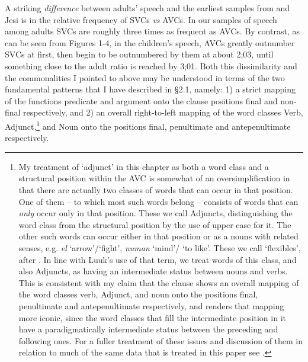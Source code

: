 \documentclass[output=paper]{langsci/langscibook}
\begin{document}
  A striking \textit{difference} between adults’ speech and the earliest samples from  and Jesi is in the relative frequency of SVCs \textit{vs} AVCs. In our samples of speech among adults SVCs are roughly three times as frequent as AVCs. By contrast, as can be seen from Figures 1-4, in the children's speech, AVCs greatly outnumber SVCs at first, then begin to be outnumbered by them at about 2;03, until something close to the adult ratio is reached by 3;01. Both this dissimilarity and the commonalities I pointed to above may be understood in terms of the two fundamental patterns that I have described in §2.1, namely: 1) a strict mapping of the functions predicate and argument   onto the clause positions final and non-final respectively, and 2) an overall right-to-left mapping of the word classes Verb, Adjunct,\footnote{My treatment of ‘adjunct’ in this chapter as both a word class and a structural position within the AVC is somewhat of an oversimplification in that there are actually two classes of words that can occur in that position. One of them – to which most such words belong – consists of words that can \textit{only} occur only in that position. These we call Adjuncts, distinguishing the word class from the structural position by the use of upper case for it. The other such words can occur either in that position or as a nouns with related senses, e.g. \textit{el} ‘arrow’/`fight’, \textit{numan} ‘mind’/ ‘to like’. These we call ‘flexibles’, after \citet{Luuk2010}. In line with Luuk’s use of that term, we treat words of this class, and also Adjuncts, as having an intermediate status between nouns and verbs. This is consistent with my claim that the  clause shows an overall mapping of the word classes verb, Adjunct, and noun onto the positions final, penultimate and antepenultimate respectively, and renders that mapping more iconic, since the word classes that fill the intermediate position in it have a paradigmatically intermediate status between the preceding and following ones. For a fuller treatment of these issues and discussion of them in relation to much of the same data that is treated in this paper see \citet{MerlanForthcoming}.} and Noun onto the positions final, penultimate and antepenultimate respectively. 
\end{document}

